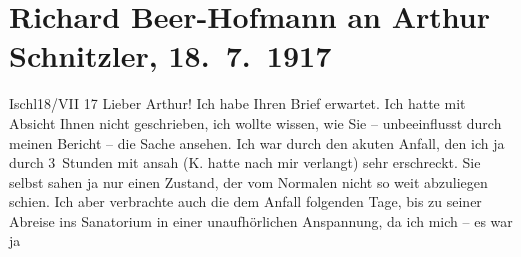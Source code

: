 

         
         \renewcommand{\erwaehntePersonen}{Personen: Richard Beer-Hofmann, Arthur Kaufmann, Malvine Kaufmann, Rudolf Kaufmann, Olga Schnitzler, Heinrich Schnitzler, Lili Schnitzler}
         \renewcommand{\erwaehnteOrte}{Orte: Bad Ischl, Salzkammergut, Sanatorium Purkersdorf, Wien}
         \renewcommand{\erwaehnteWerke}{}
               \section[Richard Beer-Hofmann an Arthur Schnitzler, 18. 7. 1917]{ Richard Beer-Hofmann an Arthur Schnitzler, 18. 7. 1917}\nopagebreak{}\rehead{ }\begin{ledgroupsized}[t]{13cm}\normalsize\beginnumbering{} \toendnotes[C]{\smallbreak\pagebreak[2]} 
\toendnotes[C]{\smallbreak}\pstart
           \raggedleft{}{\pb}Ischl18/VII 17\pend
           \pstart
           Lieber Arthur! Ich habe Ihren Brief erwartet. Ich hatte mit Absicht
               Ihnen nicht geschrieben, ich wollte wissen, wie Sie – unbeeinflusst durch meinen
               Bericht – die Sache ansehen. Ich war durch den akuten Anfall, den ich ja durch
               3 Stunden mit ansah (K. hatte nach mir
               verlangt) sehr erschreckt. Sie selbst sahen ja nur einen Zustand, der vom Normalen
               nicht so weit abzuliegen schien. Ich aber verbrachte auch die dem Anfall folgenden
               Tage, bis zu seiner Abreise ins Sanatorium in einer unaufhörlichen Anspannung, da ich mich – es war ja

\end{ledgroupsized}
